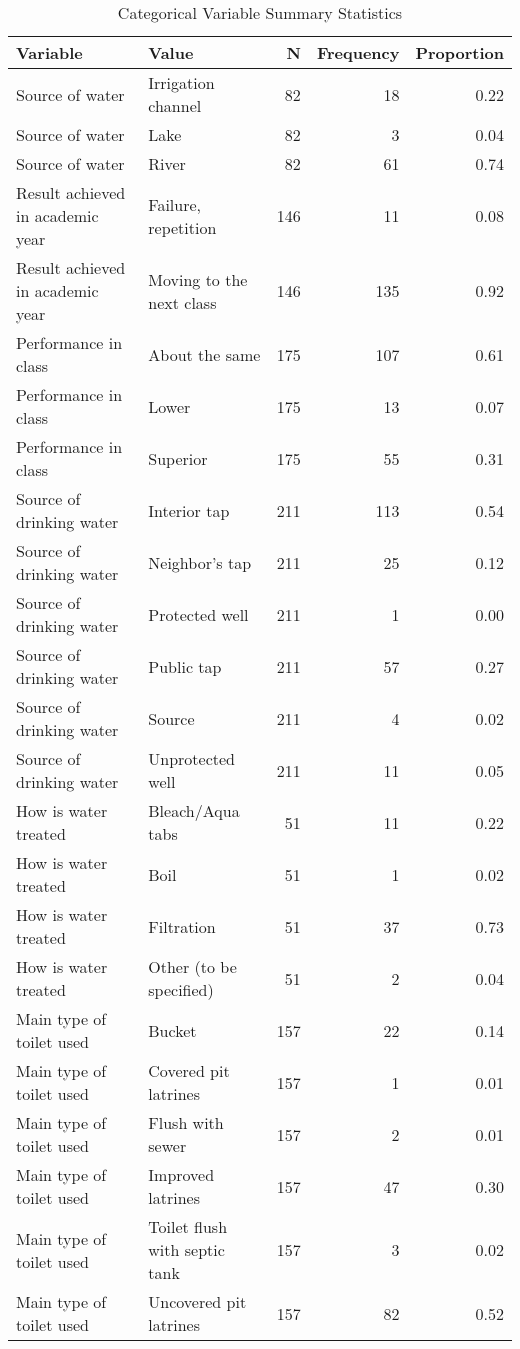 \begin{table}[!t]
\caption*{
{\large Categorical Variable Summary Statistics}
} 
\fontsize{12.0pt}{14.4pt}\selectfont
\begin{tabular*}{\linewidth}{@{\extracolsep{\fill}}llrrr}
\toprule
Variable & Value & N & Frequency & Proportion \\ 
\midrule\addlinespace[2.5pt]
Source of water & Irrigation channel & 82 & 18 & 0.22 \\ 
Source of water & Lake & 82 & 3 & 0.04 \\ 
Source of water & River & 82 & 61 & 0.74 \\ 
Result achieved in academic year & Failure, repetition & 146 & 11 & 0.08 \\ 
Result achieved in academic year & Moving to the next class & 146 & 135 & 0.92 \\ 
Performance in class & About the same & 175 & 107 & 0.61 \\ 
Performance in class & Lower & 175 & 13 & 0.07 \\ 
Performance in class & Superior & 175 & 55 & 0.31 \\ 
Source of drinking water & Interior tap & 211 & 113 & 0.54 \\ 
Source of drinking water & Neighbor’s tap & 211 & 25 & 0.12 \\ 
Source of drinking water & Protected well & 211 & 1 & 0.00 \\ 
Source of drinking water & Public tap & 211 & 57 & 0.27 \\ 
Source of drinking water & Source & 211 & 4 & 0.02 \\ 
Source of drinking water & Unprotected well & 211 & 11 & 0.05 \\ 
How is water treated & Bleach/Aqua tabs & 51 & 11 & 0.22 \\ 
How is water treated & Boil & 51 & 1 & 0.02 \\ 
How is water treated & Filtration & 51 & 37 & 0.73 \\ 
How is water treated & Other (to be specified) & 51 & 2 & 0.04 \\ 
Main type of toilet used & Bucket & 157 & 22 & 0.14 \\ 
Main type of toilet used & Covered pit latrines & 157 & 1 & 0.01 \\ 
Main type of toilet used & Flush with sewer & 157 & 2 & 0.01 \\ 
Main type of toilet used & Improved latrines & 157 & 47 & 0.30 \\ 
Main type of toilet used & Toilet flush with septic tank & 157 & 3 & 0.02 \\ 
Main type of toilet used & Uncovered pit latrines & 157 & 82 & 0.52 \\ 
\bottomrule
\end{tabular*}
\end{table}

